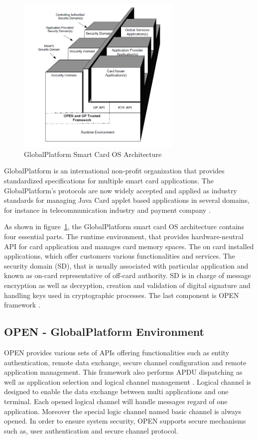 \begin{figure}[!htbp]
	\centering
	\includegraphics[width=0.7\textwidth]{gp_1.jpg}
		\caption{GlobalPlatform Smart Card OS Architecture \cite{gp}}
	\label{fig:gp_1}
\end{figure}
GlobalPlatform is an international non-profit organization that provides standardized specifications for multiple smart card applications. The  GlobalPlatform's protocols are now widely accepted and applied as industry standards for managing Java Card applet based applications in several domains, for instance in telecommunication industry and payment company \cite{gp}. 

As shown in figure~\ref{fig:gp_1},  the GlobalPlatform smart card OS architecture contains four essential parts. The runtime environment, that provides hardware-neutral API for card application  and manages card memory spaces. The on card installed applications, which offer customers various functionalities and services. The security domain (SD), that is usually associated with particular application and known as on-card representative  of off-card  authority. SD is in charge of message encryption as well as decryption, creation and validation of digital signature and handling keys used in cryptographic processes. The last component is OPEN framework \cite{gp}.

\subsection{OPEN - GlobalPlatform Environment}
OPEN provides various sets of APIs offering functionalities such as entity authentication, remote data exchange, secure channel configuration and remote application management. This framework also performs APDU dispatching as well as application selection and logical channel management \cite{gp}. Logical channel is designed to enable the data exchange between multi applications and one terminal. Each opened logical channel will handle messages regard of one application. Moreover the special logic channel named basic channel is always opened. In order to ensure system security, OPEN supports secure mechanisms such as,  user authentication and secure channel protocol.

